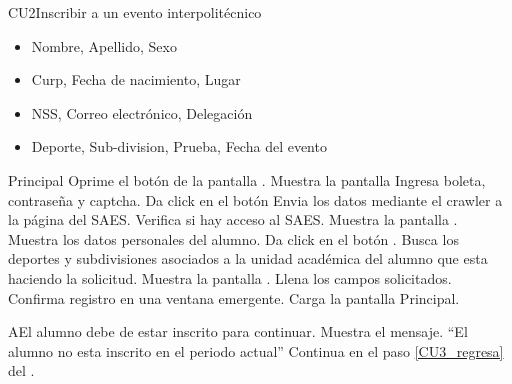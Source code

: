\begin{UseCase}{CU2}{Inscribir a un evento interpolitécnico}
{\begin{itemize}
        	\item Nombre, Apellido, Sexo
        	\item Curp, Fecha de nacimiento, Lugar
        	\item NSS, Correo electrónico, Delegación
        	\item Deporte, Sub-division, Prueba, Fecha del evento
        \end{itemize}}
		\end{UseCase}
    \begin{UCtrayectoria}{Principal}
    \UCpaso[\UCactor] Oprime el botón  de la pantalla .\label{CU3_inicio}
    \UCpaso Muestra la pantalla \label{CU3_regresa}
    \UCpaso[\UCactor] Ingresa boleta, contraseña y captcha.
    \UCpaso[\UCactor] Da click en el botón 
    \UCpaso Envia los datos mediante el crawler a la página del SAES.
    \UCpaso Verifica si hay acceso al SAES.  
    \UCpaso Muestra la pantalla .
    \UCpaso Muestra los datos personales del alumno.
	\UCpaso[\UCactor] Da click en el botón . 
	\UCpaso Busca los deportes y subdivisiones asociados a la unidad académica del alumno que esta haciendo la solicitud.
	\UCpaso Muestra la pantalla . \label{CU3_deporte}
	\UCpaso[\UCactor] Llena los campos solicitados. 
    \UCpaso Confirma registro en una ventana emergente.
    \UCpaso Carga la pantalla Principal.
    \end{UCtrayectoria}
    
	\begin{UCtrayectoriaA}{A}{El alumno debe de estar inscrito para continuar.}
		\UCpaso Muestra el mensaje. “El alumno no esta inscrito en el periodo actual”
   		\UCpaso Continua en el paso \ref{CU3_regresa} del .
	\end{UCtrayectoriaA}
	
